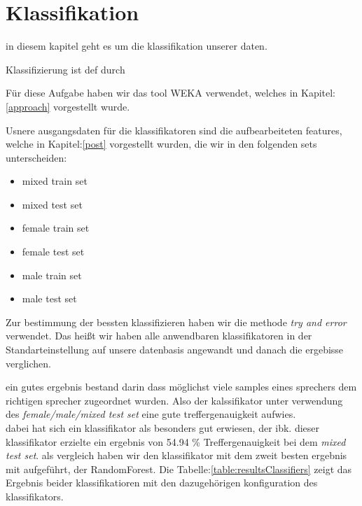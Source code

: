 \section{Klassifikation}
\label{classification}

in diesem kapitel geht es um die klassifikation unserer daten.

Klassifizierung ist def durch


Für diese Aufgabe haben wir das tool WEKA verwendet, welches in Kapitel:\ref{approach} vorgestellt wurde.

Usnere ausgangsdaten für die klassifikatoren sind die aufbearbeiteten features, welche in Kapitel:\ref{post} vorgestellt wurden, die wir in den folgenden sets unterscheiden:
\begin{itemize}
    \item[\textbullet] mixed train set
    \item[\textbullet] mixed test set
    \item[\textbullet] female train set
    \item[\textbullet] female test set
    \item[\textbullet] male train set
    \item[\textbullet] male test set    
\end{itemize}



Zur bestimmung der bessten klassifizieren haben wir die methode \textit{try and error} verwendet. Das heißt wir haben alle anwendbaren klassifikatoren in der Standarteinstellung auf unsere datenbasis angewandt und danach die ergebisse verglichen.

ein gutes ergebnis bestand darin dass möglichst viele samples eines sprechers dem richtigen sprecher zugeordnet wurden. Also der kalssifikator unter verwendung des \textit{female/male/mixed test set} eine gute treffergenauigkeit aufwies.\\





dabei hat sich ein klassifikator als besonders gut erwiesen, der ibk. dieser klassifikator erzielte ein ergebnis von 54.94 \% Treffergenauigkeit bei dem 
\textit{mixed test set}.
als vergleich haben wir den klassifikator mit dem zweit besten ergebnis mit aufgeführt, der RandomForest. Die Tabelle:\ref{table:resultsClassifiers} zeigt das Ergebnis beider klassifikatioren mit den dazugehörigen konfiguration des klassifikators. \\



